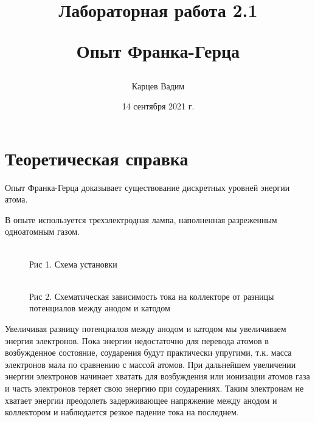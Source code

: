 \documentclass[12pt]{article}
\date{14 сентября 2021 г.}
\author{Карцев Вадим}
\title{Лабораторная работа 2.1

Опыт Франка-Герца}
\begin{document}
\maketitle

\section{Теоретическая справка}
  Опыт Франка-Герца доказывает существование дискретных уровней энергии атома.

  В опыте используется трехэлектродная лампа, наполненная разреженным
  одноатомным газом.

  \begin {figure}[h!]
    \begin{minipage}[h]{0.49\linewidth}
        \\
        Рис 1. Схема установки
    \end{minipage}
    \begin{minipage}[h]{0.49\linewidth}
        \\
        Рис 2. Схематическая зависимость тока на коллекторе от разницы потенциалов между анодом и катодом
    \end{minipage}
    \label {fig:image1}
  \end {figure}

  Увеличивая разницу потенциалов между анодом и катодом мы увеличиваем энергия электронов.
  Пока энергии недостаточно для перевода атомов в возбужденное состояние, соударения будут практически
  упругими, т.к. масса электронов мала по сравнению с массой атомов. При дальнейшем увеличении энергии
  электронов начинает хватать для возбуждения или ионизации атомов газа и часть электронов теряет свою энергию
  при соударениях. Таким электронам не хватает энергии преодолеть задерживающее напряжение между анодом и
  коллектором и наблюдается резкое падение тока на последнем.
\end{document}
